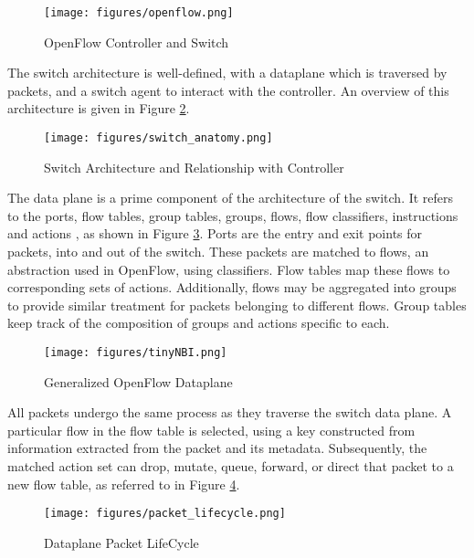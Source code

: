 \setlength{\belowcaptionskip}{-10pt}

\begin{figure}[H]
\centering
\texttt{[image: figures/openflow.png]}
\caption{OpenFlow Controller and Switch}
\label{fig:ofoverview}
\end{figure}

The switch architecture is well-defined, with a dataplane which is traversed by packets, and a switch agent to interact with the controller. An overview of this architecture is given in Figure \ref{fig:switchanatomy}.
\setlength{\belowcaptionskip}{-10pt}

\begin{figure}[H]
\centering
\texttt{[image: figures/switch\_anatomy.png]}
\caption{Switch Architecture and Relationship with Controller}
\label{fig:switchanatomy}
\end{figure}



The data plane is a prime component of the architecture of the switch. It refers to the ports, flow tables, group tables, groups, flows, flow classifiers, instructions and actions \cite{flowgrammable}, as shown in Figure \ref{fig:datamodel}. Ports are the entry and exit points for packets, into and out of the switch. These packets are matched to flows, an abstraction used in OpenFlow, using classifiers. Flow tables map these flows to corresponding sets of actions. Additionally, flows may be aggregated into groups to provide similar treatment for packets belonging to different flows. Group tables keep track of the composition of groups and actions specific to each. 

\setlength{\belowcaptionskip}{-10pt}

\begin{figure}[H]
\centering
\texttt{[image: figures/tinyNBI.png]}
\caption{Generalized OpenFlow Dataplane}
\label{fig:datamodel}
\end{figure}
\setlength{\belowcaptionskip}{0pt}

All packets undergo the same process as they traverse the switch data plane. A particular flow in the flow table is selected, using a key constructed from information extracted from the packet and its metadata. Subsequently, the matched action set can drop, mutate, queue, forward, or direct that packet to a new flow table, as referred to in Figure \ref{fig:dataplanelifecycle}.
\setlength{\belowcaptionskip}{-10pt}
\begin{figure}[H]
\centering
\texttt{[image: figures/packet\_lifecycle.png]}
\caption{Dataplane Packet LifeCycle}
\label{fig:dataplanelifecycle}
\end{figure}
\setlength{\belowcaptionskip}{0pt}

